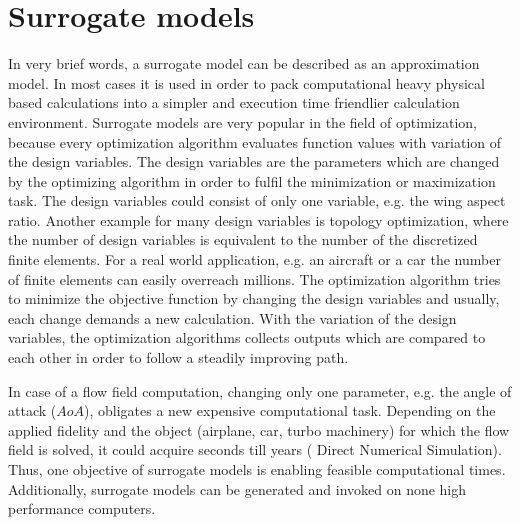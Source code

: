 
\section{Surrogate models}
\label{sec_Surrogates}
In very brief words, a surrogate model can be described
as an approximation model. In most cases 
it is used in order to pack computational heavy 
physical based calculations into a simpler 
and execution time friendlier calculation 
environment. Surrogate models are very popular in 
the field of optimization, because 
every optimization algorithm evaluates 
function values with variation of the 
design variables. The design variables 
are the parameters which are changed by the 
optimizing algorithm in order to 
fulfil the minimization or maximization task.
The design variables could consist of only one 
variable, e.g. the wing aspect ratio.
Another example for many design variables
is topology optimization, where 
the number of design variables 
is equivalent to 
the number of the discretized finite elements. For a
real world application, e.g. an aircraft or a car  
the number of finite elements can easily overreach 
millions. The 
optimization algorithm tries to 
minimize the objective function by changing 
the design variables and usually, each 
change demands a new calculation. With 
the variation of the design variables, 
the optimization algorithms collects 
outputs which are compared to each other 
in order to follow a steadily improving 
path. \newline

In case of 
a flow field computation, changing only one parameter, 
e.g. the angle of attack ($AoA$), obligates a new  
expensive computational task. Depending on the applied fidelity and the 
object (airplane, car, turbo machinery) for which the flow field 
is solved, it could acquire seconds till years (
Direct Numerical Simulation). Thus, one objective 
of surrogate models is enabling feasible computational times.
Additionally, surrogate models can be generated and invoked on 
none high performance computers.\newline 

